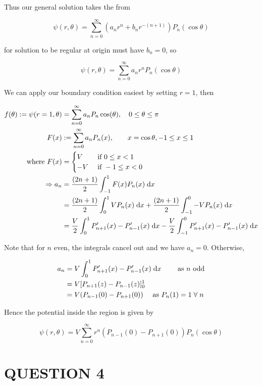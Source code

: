 \documentclass[a4paper]{article}
\begin{document}
Thus our general solution takes the from 


\[ \psi (r,\theta) =  \sum_{n=0}^{\infty} (a_{n} r^{n}  + b_{n} r^{-(n+1)}    ) P_{n} (\cos \theta)   \]


for solution to be regular at origin must have $ b_{n} = 0 $, so

\[ \psi (r,\theta) =  \sum_{n=0}^{\infty} a_{n} r^{n} P_{n} (\cos \theta)   \]

We can apply our boundary condition easiest by setting $ r=1 $, then

\begin{align*}
f(\theta) : = \psi(r=1,\theta) & = \sum_{n=0}^{\infty}  a_{n} P_{n} \cos (\theta), \quad 0 \leq \theta \leq \pi  \\
F(x) & : = \sum_{n=0}^{\infty}  a_{n} P_{n} (x), \qquad x = \cos \theta, -1 \leq x \leq 1 \\
\text{where } F(x) & = \begin{cases} V  & \text{ if } 0 \leq x < 1 \\ -V & \text{ if } -1 \leq x < 0 \end{cases} \\
\Rightarrow a_{n} & = \frac{(2n + 1)}{2} \int_{-1}^{1} F(x) P_{n}(x) \; \mathrm{d} x  \\
& = \frac{(2n + 1)}{2} \int_{0}^{1} V P_{n}(x) \; \mathrm{d} x + \frac{(2n + 1)}{2} \int_{-1}^{0} - V P_{n}(x) \; \mathrm{d} x \\
& = \frac{V}{2} \int_{0}^{1} P'_{n+1}(x) - P'_{n-1}(x) \; \mathrm{d} x - \frac{V}{2} \int_{-1}^{0}  P'_{n+1}(x) - P'_{n-1}(x) \; \mathrm{d} x
\end{align*}

Note that for $ n $ even, the integrals cancel out and we have $ a_{n} = 0 $. Otherwise, 

\begin{align*}
a_{n} & = V \int_{0}^{1}   P'_{n+1}(x) - P'_{n-1}(x) \; \mathrm{d} x \qquad \text{ as } n \text{ odd}  \\
& = V [ P_{n+1} (z) - P_{n-1}(z)  ]_{0}^{1} \\
& = V (  P_{n-1}(0) - P_{n+1}(0) ) \quad \text{ as } P_{n}(1) = 1 \; \forall \;  n
\end{align*}

Hence the potential inside the region is given by

\[ \psi (r,\theta) =  V \sum_{n=0}^{\infty} r^{n} (  P_{n-1}(0) - P_{n+1}(0) )   P_{n} (\cos \theta)   \]





\section{QUESTION 4}
\end{document}

